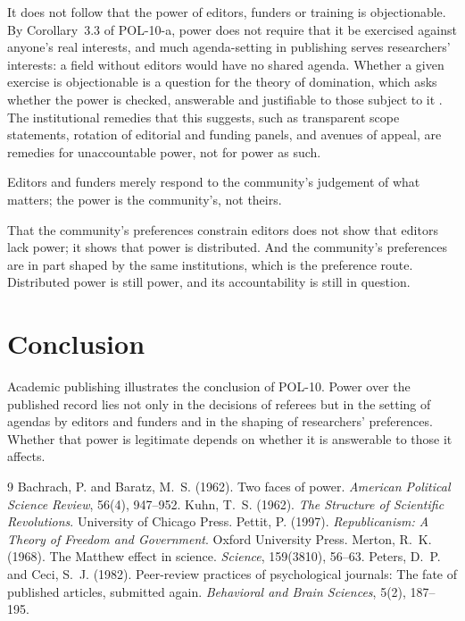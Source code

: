 \documentclass{situationist-preprint}
\begin{document}
It does not follow that the power of editors, funders or training is objectionable. By Corollary~3.3 of POL-10-a, power does not require that it be exercised against anyone's real interests, and much agenda-setting in publishing serves researchers' interests: a field without editors would have no shared agenda. Whether a given exercise is objectionable is a question for the theory of domination, which asks whether the power is checked, answerable and justifiable to those subject to it \citep{Pettit1997}. The institutional remedies that this suggests, such as transparent scope statements, rotation of editorial and funding panels, and avenues of appeal, are remedies for unaccountable power, not for power as such.

\begin{objection}
Editors and funders merely respond to the community's judgement of what matters; the power is the community's, not theirs.
\end{objection}

\begin{reply}
That the community's preferences constrain editors does not show that editors lack power; it shows that power is distributed. And the community's preferences are in part shaped by the same institutions, which is the preference route. Distributed power is still power, and its accountability is still in question.
\end{reply}

\section{Conclusion}

Academic publishing illustrates the conclusion of POL-10. Power over the published record lies not only in the decisions of referees but in the setting of agendas by editors and funders and in the shaping of researchers' preferences. Whether that power is legitimate depends on whether it is answerable to those it affects.

\begin{thebibliography}{9}
 Bachrach, P. and Baratz, M.~S. (1962). Two faces of power. \emph{American Political Science Review}, 56(4), 947--952.
 Kuhn, T.~S. (1962). \emph{The Structure of Scientific Revolutions}. University of Chicago Press.
 Pettit, P. (1997). \emph{Republicanism: A Theory of Freedom and Government}. Oxford University Press.
 Merton, R.~K. (1968). The Matthew effect in science. \emph{Science}, 159(3810), 56--63.
 Peters, D.~P. and Ceci, S.~J. (1982). Peer-review practices of psychological journals: The fate of published articles, submitted again. \emph{Behavioral and Brain Sciences}, 5(2), 187--195.
\end{thebibliography}
\end{document}
